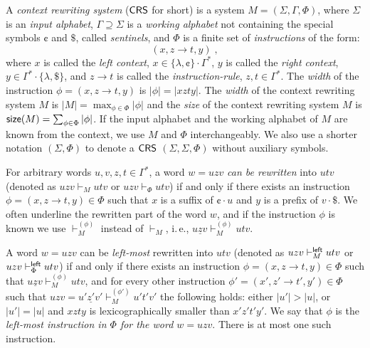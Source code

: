 \begin{definition}\label{definition:crs}
A \emph{context rewriting system} (\index{$\CRS$}\emph{$\CRS$} for short) is a system $M = (\Sigma, \Gamma, \Phi)$, where $\Sigma$ is an \emph{input alphabet}, $\Gamma \supseteq \Sigma$ is a \emph{working alphabet} not containing the special symbols \index{$\cent$}$\cent$ and \index{$\$$}$\$$, called \emph{sentinels}, and $\Phi$ is a finite set of \emph{instructions} of the form:
$$(x, z \to t, y)\;,$$
where $x$ is called the \emph{left context}, $x \in \{\lambda, \cent\}\cdot\Gamma^*$, $y$ is called the \emph{right context}, $y \in \Gamma^*\cdot\{\lambda, \$\}$, and $z \to t$ is called the \emph{instruction-rule}, $z, t \in \Gamma^*$. The \emph{width} of the instruction $\phi = (x, z \to t, y)$ is $|\phi| = |xzty|$. The \emph{width} of the context rewriting system $M$ is $|M| = \max_{\phi \in \Phi} |\phi|$ and the \emph{size} of the context rewriting system $M$ is $\textup{\sf size}(M) = \sum_{\phi \in \Phi} |\phi|$. If the input alphabet and the working alphabet of $M$ are known from the context, we use $M$ and $\Phi$ interchangeably. We also use a shorter notation $(\Sigma, \Phi)$ to denote a $\CRS$ $(\Sigma, \Sigma, \Phi)$ without auxiliary symbols.

For arbitrary words $u, v, z, t \in \Gamma^*$, a word $w = uzv$ \emph{can be rewritten} into $utv$ (denoted as $uzv \vdash_M utv$ or \index{$\vdash_{\Phi}$}$uzv \vdash_{\Phi} utv$) if and only if there exists an instruction $\phi = (x, z \to t, y) \in \Phi$ such that $x$ is a suffix of $\cent \cdot u$ and $y$ is a prefix of $v \cdot \$ $. We often underline the rewritten part of the word $w$, and if the instruction $\phi$ is known we use $\vdash^{(\phi)}_M$ instead of $\vdash_M$, i.\,e., $u \underline{z} v \vdash^{(\phi)}_M utv$.

A word $w = uzv$ can be \emph{left-most} rewritten into $utv$ (denoted as $uzv \vdash^{\sf left}_M utv$ or $uzv \vdash^{\sf left}_{\Phi} utv$) if and only if there exists an instruction $\phi = (x, z \to t, y) \in \Phi$ such that $u \underline{z} v \vdash^{(\phi)}_M utv$, and for every other instruction $\phi' = (x', z' \to t', y') \in \Phi$ such that $uzv = u' \underline{z'} v' \vdash^{(\phi')}_M u't'v'$ the following holds: either $|u'| > |u|$, or $|u'| = |u|$ and $xzty$ is lexicographically smaller than $x'z't'y'$. We say that $\phi$ is the \emph{left-most instruction in $\Phi$ for the word $w = uzv$}. There is at most one such instruction.


\end{definition}
